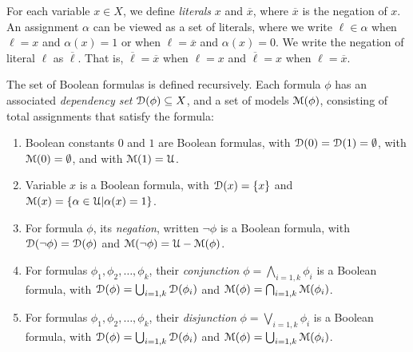 \documentclass[letterpaper,USenglish,cleveref, autoref, thm-restate]{lipics-v2021}
\newcommand{\boolnot}{\neg}
\newcommand{\obar}[1]{\overline{#1}}
\newcommand{\lit}{\ell}
\newcommand{\varset}{X}
\newcommand{\dependencyset}{{\cal D}}
\newcommand{\assign}{\alpha}
\newcommand{\uassign}{{\cal U}}
\newcommand{\modelset}{{\cal M}}
\begin{document}
For each variable $x \in \varset$,
  we define {\em literals} $x$ and $\obar{x}$, where $\obar{x}$ is the
  negation of $x$. An
  assignment $\assign$ can be viewed as a set of literals, where
  we write $\lit \in \assign$ when $\lit = x$ and $\assign(x) = 1$ or when
  $\lit = \obar{x}$ and $\assign(x) = 0$.  We write the negation of literal $\lit$ as $\obar{\lit}$.  That is, $\obar{\lit} = \obar{x}$ when $\lit = x$ and
$\obar{\lit} = x$ when $\lit = \obar{x}$.


\begin{definition}
  The set of Boolean formulas is defined recursively.  Each
  formula $\phi$ has an associated {\em dependency set}
  $\dependencyset(\phi)  \subseteq \varset$, and a set of models $\modelset(\phi)$,
  consisting of total assignments that satisfy the formula:
  \begin{enumerate}
  \item Boolean constants $0$ and $1$ are Boolean formulas,
    with $\dependencyset(0) = \dependencyset(1) = \emptyset$, with $\modelset(0) = \emptyset$, and with $\modelset(1) = \uassign$.
  \item Variable $x$ is a Boolean formula, with $\dependencyset(x) = \{x\}$
    and $\modelset(x) = \{\assign \in \uassign | \assign(x)=1\}$.
  \item For formula $\phi$, its {\em negation}, written $\boolnot \phi$ is a Boolean formula,
    with $\dependencyset(\boolnot \phi) = \dependencyset(\phi)$ and $\modelset(\boolnot \phi) = \uassign - \modelset(\phi)$.
  \item For formulas $\phi_1, \phi_2, \ldots, \phi_k$, their {\em conjunction} $\phi = \bigwedge_{i=1,k} \phi_i$ is a Boolean formula, with
      $\dependencyset(\phi) = \bigcup_{i=1,k} \dependencyset(\phi_i)$ and
      $\modelset(\phi) = \bigcap_{i=1,k} \modelset(\phi_i)$.
  \item For formulas $\phi_1, \phi_2, \ldots, \phi_k$, their {\em disjunction} $\phi = \bigvee_{i=1,k} \phi_i$ is a Boolean formula, with
      $\dependencyset(\phi) = \bigcup_{i=1,k} \dependencyset(\phi_i)$ and
      $\modelset(\phi) = \bigcup_{i=1,k} \modelset(\phi_i)$.
  \end{enumerate}
\label{def:boolean}
\end{definition}
  
\end{document}

